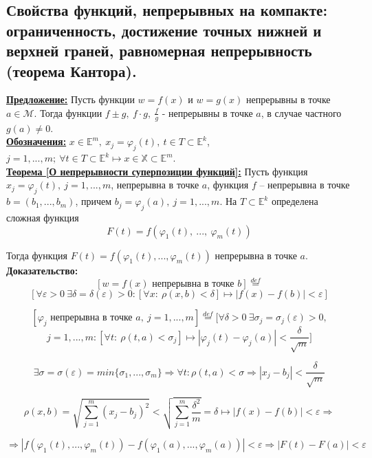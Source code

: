 \documentclass[a4paper,12pt]{article} %
\begin{document}
	\subsection{Свойства функций, непрерывных на компакте: ограниченность, достижение точных нижней и верхней граней, равномерная непрерывность (теорема Кантора).}
	\underline{\textbf{Предложение:}} Пусть функции $w = f(x)$ и $w = g(x)$ непрерывны в точке $a \in \mathscr{M}$. Тогда функции $f \pm g, ~ f\cdot g, ~ \frac{f}{g} \text{ - непрерывны в точке } a$, 
	в случае частного $g(a) \neq 0$.\\
	
	\underline{\textbf{Обозначения:}} $x \in \mathbb{E}^m, ~ x_j = \varphi_j(t), ~t \in T \subset \mathbb{E}^k$,
	$j = 1, ..., m;~\forall t \in T \subset \mathbb{E}^k \mapsto x \in \mathbb{X} \subset \mathbb{E}^m$.\\
	
	\underline{\textbf{Теорема [О непрерывности суперпозиции функций]:}} Пусть функция $x_j = \varphi_j(t),~ j = 1, ..., m$, непрерывна в точке $a$, функция $f$ -- непрерывна в точке $b = (b_1, ..., b_m)$, причем $b_j = \varphi_j(a), ~ j = 1, ..., m$.
	На $T \subset \mathbb{E}^k$ определена сложная функция 
	\[F(t) = f(\varphi_1(t),~ ..., ~\varphi_m(t))\]
	
	Тогда функция $F(t) = f(\varphi_1(t), ..., \varphi_m(t))$ непрерывна в точке $a$.\\
	
	\textbf{Доказательство:}\\ 
	\[ [w = f(x) \text{ непрерывна в точке } b] \stackrel{def}{=} \]
	\[[\forall \varepsilon > 0~\exists\delta = \delta(\varepsilon) > 0: [\forall x: ~  \rho (x, b) < \delta] \mapsto |f(x) - f(b)| < \varepsilon]\]
	
	\[ [\varphi_j \text{ непрерывна в точке } a, ~ j = 1, ..., m] \stackrel{def}{=} [\forall \delta > 0~\exists\sigma_j = \sigma_j(\varepsilon) > 0,\]
	\[j = 1, ..., m:
	[\forall t: ~ \rho (t, a) < \sigma_j] \mapsto |\varphi_j(t) - \varphi_j(a)| < \frac{\delta}{\sqrt{m}}]\]
	
	\[\exists \sigma = \sigma(\varepsilon) = min\{\sigma_1, ..., \sigma_m\} \Rightarrow \forall t: \rho(t, a) < \sigma \Rightarrow |x_j - b_j| < \frac{\delta}{\sqrt{m}}\]
	
	\[ \rho(x, b) = \sqrt{\sum\limits_{j = 1}^{m}(x_j - b_j)^2} < \sqrt{\sum\limits_{j = 1}^{m}\frac{\delta^2}{m}} = \delta \mapsto |f(x) - f(b)| < \varepsilon \Rightarrow\]
	
	\[\Rightarrow |f(\varphi_1(t), ..., \varphi_m(t)) - f(\varphi_1(a), ..., \varphi_m(a))| < \varepsilon \Rightarrow |F(t) - F(a)| < \varepsilon \]
	
\end{document}
